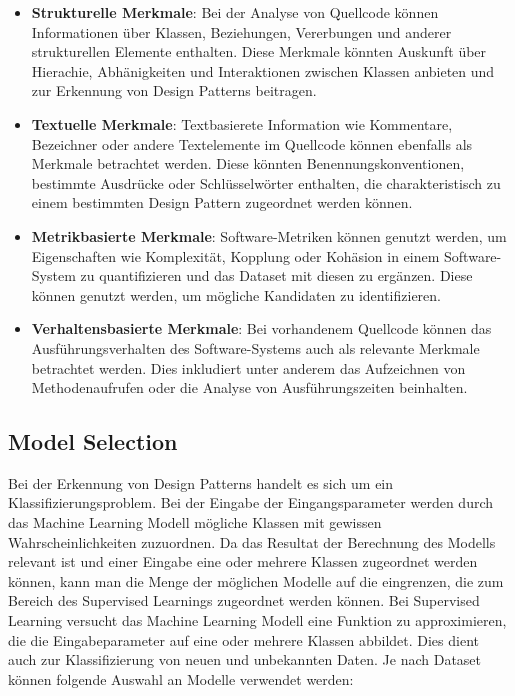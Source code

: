 \documentclass[conference]{IEEEtran}
\begin{document}
\begin{itemize}
    \item \textbf{Strukturelle Merkmale}: Bei der Analyse von Quellcode können Informationen über Klassen, Beziehungen, Vererbungen und anderer strukturellen Elemente enthalten. Diese Merkmale könnten Auskunft über Hierachie, Abhänigkeiten und Interaktionen zwischen Klassen anbieten und zur Erkennung von Design Patterns beitragen.
    \item \textbf{Textuelle Merkmale}: Textbasierete Information wie Kommentare, Bezeichner oder andere Textelemente im Quellcode können ebenfalls als Merkmale betrachtet werden. Diese könnten Benennungskonventionen, bestimmte Ausdrücke oder Schlüsselwörter enthalten, die charakteristisch zu einem bestimmten Design Pattern zugeordnet werden können.
    \item \textbf{Metrikbasierte Merkmale}: Software-Metriken können genutzt werden, um Eigenschaften wie Komplexität, Kopplung oder Kohäsion in einem Software-System zu quantifizieren und das Dataset mit diesen zu ergänzen. Diese können genutzt werden, um mögliche Kandidaten zu identifizieren.
    \item \textbf{Verhaltensbasierte Merkmale}: Bei vorhandenem Quellcode können das Ausführungsverhalten des Software-Systems auch als relevante Merkmale betrachtet werden. Dies inkludiert unter anderem das Aufzeichnen von Methodenaufrufen oder die Analyse von Ausführungszeiten beinhalten.
\end{itemize}


\subsection{Model Selection}

Bei der Erkennung von Design Patterns handelt es sich um ein Klassifizierungsproblem. Bei der Eingabe der Eingangsparameter werden durch das Machine Learning Modell mögliche Klassen mit gewissen Wahrscheinlichkeiten zuzuordnen.
Da das Resultat der Berechnung des Modells relevant ist und einer Eingabe eine oder mehrere Klassen zugeordnet werden können, kann man die Menge der möglichen Modelle auf die eingrenzen, die zum Bereich des Supervised Learnings zugeordnet werden können.
Bei Supervised Learning versucht das Machine Learning Modell eine Funktion zu approximieren, die die Eingabeparameter auf eine oder mehrere Klassen abbildet. Dies dient auch zur Klassifizierung von neuen und unbekannten Daten. 
Je nach Dataset können folgende Auswahl an Modelle verwendet werden:
\end{document}
